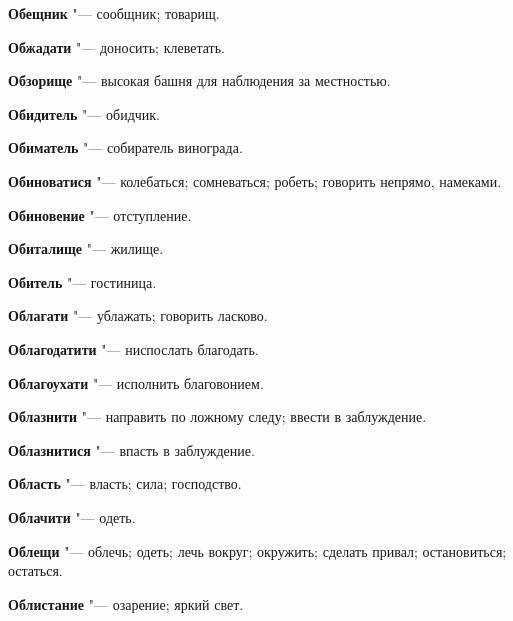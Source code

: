 \begin{mymulticols}{2}
\noindent\textbf{Обещник} "--- сообщник; товарищ. 




\noindent\textbf{Обжадати} "--- доносить; клеветать. 




\noindent\textbf{Обзорище} "--- высокая башня для наблюдения за местностью. 




\noindent\textbf{Обидитель} "--- обидчик. 




\noindent\textbf{Обиматель} "--- собиратель винограда. 




\noindent\textbf{Обиноватися} "--- колебаться; сомневаться; робеть; говорить непрямо, намеками. 




\noindent\textbf{Обиновение} "--- отступление. 




\noindent\textbf{Обиталище} "--- жилище. 




\noindent\textbf{Обитель} "--- гостиница. 




\noindent\textbf{Облагати} "--- ублажать; говорить ласково. 




\noindent\textbf{Облагодатити} "--- ниспослать благодать. 




\noindent\textbf{Облагоухати} "--- исполнить благовонием. 




\noindent\textbf{Облазнити} "--- направить по ложному следу; ввести в заблуждение. 




\noindent\textbf{Облазнитися} "--- впасть в заблуждение. 




\noindent\textbf{Область} "--- власть; сила; господство. 




\noindent\textbf{Облачити} "--- одеть. 




\noindent\textbf{Облещи} "--- облечь; одеть; лечь вокруг; окружить; сделать привал; остановиться; остаться. 




\noindent\textbf{Облистание} "--- озарение; яркий свет. 





\end{mymulticols}
